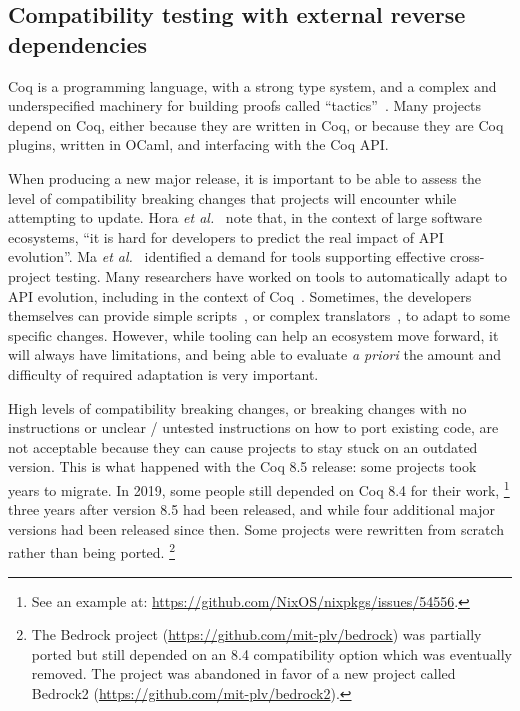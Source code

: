 \subsection{Compatibility testing with external reverse dependencies}

\label{sec:compatibility-testing}

Coq is a programming language, with a strong type system, and a complex and underspecified machinery for building proofs called ``tactics''~\cite{coq_refman}.
Many projects depend on Coq, either because they are written in Coq, or because they are Coq plugins, written in OCaml, and interfacing with the Coq API.

When producing a new major release, it is important to be able to assess the level of compatibility breaking changes that projects will encounter while attempting to update.
Hora \emph{et al.}~\cite{hora2018developers} note that, in the context of large software ecosystems, ``it is hard for developers to predict the real impact of API evolution''.
Ma \emph{et al.}~\cite{ma2017developers} identified a demand for tools supporting effective cross-project testing.
Many researchers have worked on tools to automatically adapt to API evolution, including in the context of Coq~\cite{ringer2018adapting}.
Sometimes, the developers themselves can provide simple scripts~\cite{gross2018script}, or complex translators~\cite{barras2004translator}, to adapt to some specific changes.
However, while tooling can help an ecosystem move forward, it will always have limitations, and being able to evaluate \emph{a priori} the amount and difficulty of required adaptation is very important.

High levels of compatibility breaking changes, or breaking changes with no instructions or unclear / untested instructions on how to port existing code, are not acceptable because they can cause projects to stay stuck on an outdated version.
This is what happened with the Coq 8.5 release: some projects took years to migrate.
In 2019, some people still depended on Coq 8.4 for their work,%
\footnote{
	See an example at: \url{https://github.com/NixOS/nixpkgs/issues/54556}.
}
three years after version 8.5 had been released, and while four additional major versions had been released since then.
Some projects were rewritten from scratch rather than being ported.%
\footnote{
	The Bedrock project (\url{https://github.com/mit-plv/bedrock}) was partially ported but still depended on an 8.4 compatibility option which was eventually removed. The project was abandoned in favor of a new project called Bedrock2 (\url{https://github.com/mit-plv/bedrock2}).
}

